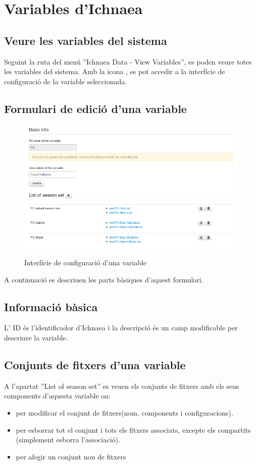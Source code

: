 \section{Variables d'Ichnaea}
\subsection{Veure les variables del sistema}
Seguint la ruta del menú ''Ichnaea  Data - View Variables'', es poden veure totes les variables del sistema. Amb la icona \iconeyeopen, es pot accedir a la interfície de configuraci\'{o} de la variable seleccionada.

\subsection{Formulari de edici\'{o} d'una variable}
\begin{figure}[h!]
  \centering
  \includegraphics[scale=0.5]{img/userguide/variable_configuration.png}
  \caption{Interfície de configuraci\'{o} d'una variable}
  \label{fig:placement}
\end{figure}
A continuació es descriuen les parts bàsiques d'aquest formulari.

\subsection*{Informació bàsica}
L' ID \'{e}s l'identificador d'Ichnaea i la descripció \'{e}s un camp modificable per descriure la variable.

\subsection{Conjunts de fitxers d'una variable}
A l'apartat ''List of season set'' es veuen els conjunts de fitxers amb els seus components d'aquesta variable on:
\begin{itemize}
\item \iconedit per modificar el conjunt de fitxers(nom, components i configuracions).
\item \icontrash per esborrar tot el conjunt i tots els fitxers associats, excepte els compartits (simplement esborra l'associació).
\item \iconadd per afegir un conjunt nou de fitxers
\end{itemize}

